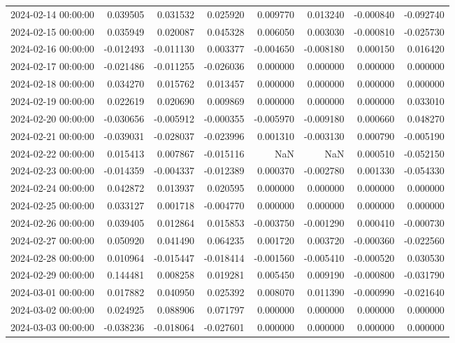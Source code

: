 \begin{tabular}{lrrrrrrr}
2024-02-14 00:00:00 & 0.039505 & 0.031532 & 0.025920 & 0.009770 & 0.013240 & -0.000840 & -0.092740 \\
2024-02-15 00:00:00 & 0.035949 & 0.020087 & 0.045328 & 0.006050 & 0.003030 & -0.000810 & -0.025730 \\
2024-02-16 00:00:00 & -0.012493 & -0.011130 & 0.003377 & -0.004650 & -0.008180 & 0.000150 & 0.016420 \\
2024-02-17 00:00:00 & -0.021486 & -0.011255 & -0.026036 & 0.000000 & 0.000000 & 0.000000 & 0.000000 \\
2024-02-18 00:00:00 & 0.034270 & 0.015762 & 0.013457 & 0.000000 & 0.000000 & 0.000000 & 0.000000 \\
2024-02-19 00:00:00 & 0.022619 & 0.020690 & 0.009869 & 0.000000 & 0.000000 & 0.000000 & 0.033010 \\
2024-02-20 00:00:00 & -0.030656 & -0.005912 & -0.000355 & -0.005970 & -0.009180 & 0.000660 & 0.048270 \\
2024-02-21 00:00:00 & -0.039031 & -0.028037 & -0.023996 & 0.001310 & -0.003130 & 0.000790 & -0.005190 \\
2024-02-22 00:00:00 & 0.015413 & 0.007867 & -0.015116 & NaN & NaN & 0.000510 & -0.052150 \\
2024-02-23 00:00:00 & -0.014359 & -0.004337 & -0.012389 & 0.000370 & -0.002780 & 0.001330 & -0.054330 \\
2024-02-24 00:00:00 & 0.042872 & 0.013937 & 0.020595 & 0.000000 & 0.000000 & 0.000000 & 0.000000 \\
2024-02-25 00:00:00 & 0.033127 & 0.001718 & -0.004770 & 0.000000 & 0.000000 & 0.000000 & 0.000000 \\
2024-02-26 00:00:00 & 0.039405 & 0.012864 & 0.015853 & -0.003750 & -0.001290 & 0.000410 & -0.000730 \\
2024-02-27 00:00:00 & 0.050920 & 0.041490 & 0.064235 & 0.001720 & 0.003720 & -0.000360 & -0.022560 \\
2024-02-28 00:00:00 & 0.010964 & -0.015447 & -0.018414 & -0.001560 & -0.005410 & -0.000520 & 0.030530 \\
2024-02-29 00:00:00 & 0.144481 & 0.008258 & 0.019281 & 0.005450 & 0.009190 & -0.000800 & -0.031790 \\
2024-03-01 00:00:00 & 0.017882 & 0.040950 & 0.025392 & 0.008070 & 0.011390 & -0.000990 & -0.021640 \\
2024-03-02 00:00:00 & 0.024925 & 0.088906 & 0.071797 & 0.000000 & 0.000000 & 0.000000 & 0.000000 \\
2024-03-03 00:00:00 & -0.038236 & -0.018064 & -0.027601 & 0.000000 & 0.000000 & 0.000000 & 0.000000 \\

\end{tabular}
